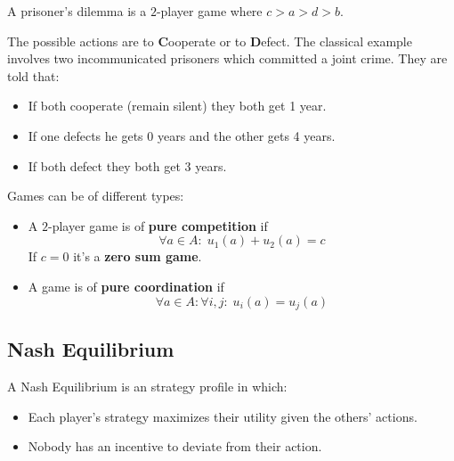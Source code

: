 \documentclass{tufte-handout}
\begin{document}
\begin{marginfigure}

\begin{center}
\end{center}
\vspace*{2mm}

A prisoner's dilemma is a $2$-player game where $c > a > d > b$.

The possible actions are to \textbf{C}ooperate or to \textbf{D}efect.
The classical example involves two incommunicated prisoners which
committed a joint crime. They are told that:

\begin{itemize}
  \item If both cooperate (remain silent) they both get 1 year.
  \item If one defects he gets 0 years and the other gets 4 years.
  \item If both defect they both get 3 years.
\end{itemize}
\end{marginfigure}


Games can be of different types:

\begin{itemize}
\item A $2$-player game is of \textbf{pure competition} if
\[ \forall a \in A: \; u_1(a) + u_2(a) = c\]
If $c = 0$ it's a \textbf{zero sum game}.
\item A game is of \textbf{pure coordination} if
\[\forall a \in A: \forall i,j: \; u_i(a) = u_j(a)\]
\end{itemize}

\pagebreak

\subsection{Nash Equilibrium}

A Nash Equilibrium is an strategy profile in which:

\begin{itemize}
\item  Each player's strategy maximizes their utility given the others' actions.
\item  Nobody has an incentive to deviate from their action.
\end{itemize}
\end{document}
